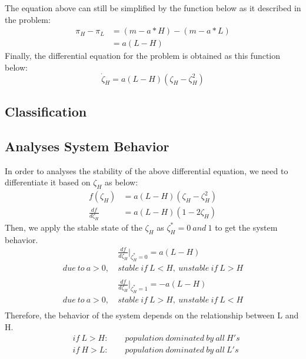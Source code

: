 \documentclass[a4paper, 12pt]{article}
\begin{document}
The equation above can still be simplified by the function below as it described in the problem: 
\vspace{-3mm}
\begin{equation}
\begin{split}
	\pi_{H} - \pi_{L} & =  (m - a*H)-(m-a*L) \\
	& = a(L - H)
\end{split}		
\end{equation}
Finally, the differential equation for the problem is obtained as this function below:
\vspace{-3mm}
\begin{equation}
	\dot\zeta_{H} = a(L-H)(\zeta_{H}-\zeta_{H}^{2})
\end{equation}

\subsection{Classification}


\subsection{Analyses System Behavior}
In order to analyses the stability of the above differential equation, we need to differentiate it based on $\zeta_{H}$ as below:
\vspace{-3mm}
\begin{equation}
\begin{split}
	f(\zeta_{H}) &= a(L-H)(\zeta_{H}-\zeta_{H}^{2}) \\
	\frac{df}{d\zeta_{H}} &= a(L-H)(1-2\zeta_{H})
\end{split}		
\end{equation}
Then, we apply the stable state of the $\zeta_{H}$ as $\zeta_{H}^{*} = 0\ and\ 1$ to get the system behavior.
\begin{equation}
\begin{split}
	&\frac{df}{d\zeta_{H}}|_{\zeta_{H}^{*} = 0}=a(L-H)\\
	due\ to\ a>0,\ & stable\ if\ L<H,\ unstable\ if\ L>H \\
\end{split}
\end{equation}
\begin{equation}
\begin{split}
	&\frac{df}{d\zeta_{H}}|_{\zeta_{H}^{*} = 1}=-a(L-H)\\
	due\ to\ a>0,\ & stable\ if\ L>H,\ unstable\ if\ L<H \\
\end{split}
\end{equation}
Therefore, the behavior of the system depends on the relationship between L and H.
\begin{equation}
\begin{split}
	&if\ L>H:\qquad population\ dominated\ by\ all\ H's \\
	&if\ H>L:\qquad population\ dominated\ by\ all\ L's \\ 
\end{split}
\end{equation}
\end{document}

